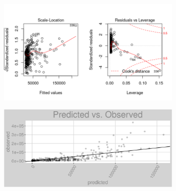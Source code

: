 \begin{figure}[h]
\centering
\begin{subfigure}{1\textwidth}
\centering
\includegraphics[width=.99\textwidth, height=0.475\textheight]{Images/district_heat_nn_res_2.png}
\end{subfigure}
\begin{subfigure}{1\textwidth}
\centering
\includegraphics[width=.99\textwidth, height=0.3\textheight]{Images/district_heat_nn_pvo.png}
\end{subfigure}
\end{figure}
\FloatBarrier
\newpage
